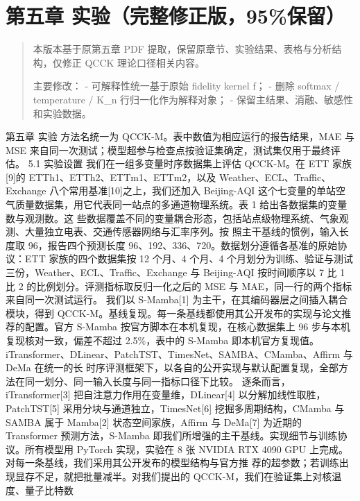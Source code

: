 \documentclass[
]{article}
\author{}
\date{}
\begin{document}
\section{第五章
实验（完整修正版，95\%保留）}\label{ux7b2cux4e94ux7ae0-ux5b9eux9a8cux5b8cux6574ux4feeux6b63ux724895ux4fddux7559}

\begin{quote}
本版本基于原第五章 PDF
提取，保留原章节、实验结果、表格与分析结构，仅修正 QCCK
理论口径相关内容。

主要修改： - 可解释性统一基于原始 fidelity kernel f； - 删除 softmax /
temperature / K\_n 行归一化作为解释对象； -
保留主结果、消融、敏感性和实验数据。
\end{quote}

第五章 实验 方法名统一为 QCCK-M。表中数值为相应运行的报告结果，MAE 与
MSE 来自同一次测试；模型超参与检查点按验证集确定，测试集仅用于最终评估。
5.1 实验设置 我们在一组多变量时序数据集上评估 QCCK-M。在 ETT
家族{[}9{]}的 ETTh1、ETTh2、ETTm1、ETTm2，以及
Weather、ECL、Traffic、Exchange 八个常用基准{[}10{]}之上，我们还加入
Beijing-AQI
这个七变量的单站空气质量数据集，用它代表同一站点的多通道物理系统。表 1
给出各数据集的变量数与观测数。这
些数据覆盖不同的变量耦合形态，包括站点级物理系统、气象观测、大量独立电表、交通传感器网络与汇率序列。按
照主干基线的惯例，输入长度取 96，报告四个预测长度
96、192、336、720。数据划分遵循各基准的原始协议：ETT 家族的四个数据集按
12 个月、4 个月、4
个月划分为训练、验证与测试三份，Weather、ECL、Traffic、Exchange 与
Beijing-AQI 按时间顺序以 7 比 1 比 2
的比例划分。评测指标取反归一化之后的 MSE 与
MAE，同一行的两个指标来自同一次测试运行。 我们以 S-Mamba{[}1{]}
为主干，在其编码器层之间插入耦合模块，得到
QCCK-M。基线复现。每一条基线都使用其公开发布的实现与论文推荐的配置。官方
S-Mamba 按官方脚本在本机复现，在核心数据集上 96
步与本机复现核对一致，偏差不超过 2.5\%，表中的 S-Mamba
即本机官方复现值。iTransformer、DLinear、PatchTST、TimesNet、SAMBA、CMamba、Affirm
与 DeMa 在统一的长
时序评测框架下，以各自的公开实现与默认配置复现，全部方法在同一划分、同一输入长度与同一指标口径下比较。
逐条而言，iTransformer{[}3{]} 把自注意力作用在变量维，DLinear{[}4{]}
以分解加线性取胜，PatchTST{[}5{]} 采用分块与通道独立，TimesNet{[}6{]}
挖掘多周期结构，CMamba 与 SAMBA 属于 Mamba{[}2{]} 状态空间家族，Affirm
与 DeMa{[}7{]} 为近期的 Transformer 预测方法，S-Mamba
即我们所增强的主干基线。实现细节与训练协议。所有模型用 PyTorch
实现，实验在 8 张 NVIDIA RTX 4090 GPU
上完成。对每一条基线，我们采用其公开发布的模型结构与官方推
荐的超参数；若训练出现显存不足，就把批量减半。对我们提出的
QCCK-M，我们在验证集上对核温度、量子比特数
\end{document}
